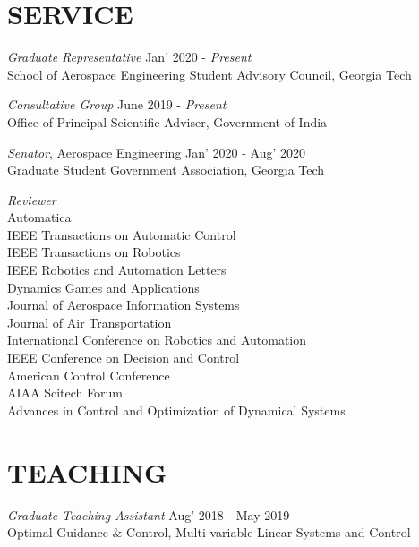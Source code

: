 \documentclass[margin, 10pt]{res} %
\begin{document}
\begin{resume}

\section{SERVICE}

{\sl Graduate Representative} \hfill Jan' 2020 - \emph{Present}\\
School of Aerospace Engineering Student Advisory Council, Georgia Tech

{\sl Consultative Group} \hfill June 2019 - \emph{Present}\\
Office of Principal Scientific Adviser, Government of India

{\sl Senator}, Aerospace Engineering \hfill Jan' 2020 - Aug' 2020\\
Graduate Student Government Association, Georgia Tech

{\sl Reviewer}\\
Automatica\\
IEEE Transactions on Automatic Control\\
IEEE Transactions on Robotics\\
IEEE Robotics and Automation Letters\\
Dynamics Games and Applications\\
Journal of Aerospace Information Systems\\
Journal of Air Transportation\\
International Conference on Robotics and Automation\\
IEEE Conference on Decision and Control\\
American Control Conference\\
AIAA Scitech Forum\\
Advances in Control and Optimization of Dynamical Systems


\section{TEACHING}

{\sl Graduate Teaching Assistant} \hfill Aug' 2018 - May 2019\\
Optimal Guidance \& Control, Multi-variable Linear Systems and Control


\end{resume}
\end{document}
